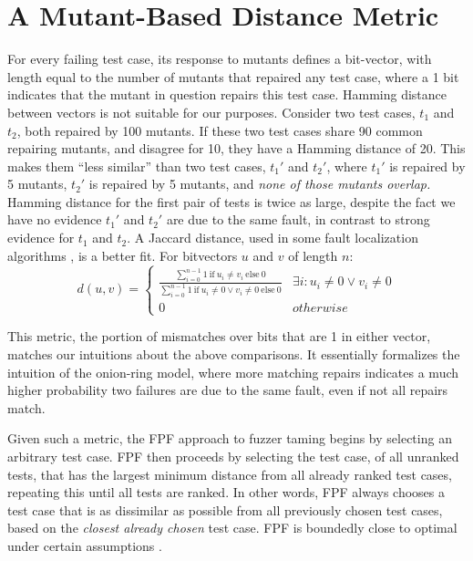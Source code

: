 \section{A Mutant-Based Distance Metric}

For every failing test case, its response to mutants defines a bit-vector, with
length equal to the number of mutants that repaired any test case,
where a 1 bit indicates that the mutant in question repairs this test
case.  Hamming distance between vectors is not suitable for our purposes.  Consider two test cases, $t_1$ and $t_2$, both repaired
by 100 mutants.  If these two test cases share 90 common repairing
mutants, and disagree for 10, they have a Hamming
distance of 20.  This makes them ``less similar'' than two test cases,
$t_1'$ and $t_2'$, where $t_1'$ is repaired by 5 mutants, $t_2'$ is
repaired by 5 mutants, and \emph{none of those mutants overlap.}   Hamming distance for the first pair of tests is twice as
large, despite the fact we have no evidence $t_1'$ and
$t_2'$ are due to the same fault, in contrast to strong evidence for $t_1$ and $t_2$.  A Jaccard distance, used in some fault
localization algorithms \cite{Liu06}, is a better fit.  For bitvectors $u$ and $v$ of length $n$:
\[d(u,v) = 
\begin{cases}
\frac{\sum_{i=0}^{n-1} 1\ \text{if}\ u_i \neq v_i\ \text{else}\ 0}{\sum_{i=0}^{n-1} 1
\  \text{if}\ u_i \neq 0 \vee v_i \neq 0\ \text{else}\ 0} & \exists i:u_i\neq 0 \vee v_i\neq 0\\
0 & otherwise
\end{cases}
\]

This metric, the portion of mismatches over bits that are 1 in either
vector, matches our intuitions about the above comparisons.  It
essentially formalizes the intuition of the onion-ring model, where
more matching repairs indicates a much higher probability two failures
are due to the same fault, even if not all repairs match.

Given such a metric, the FPF \cite{Gonzalez} approach to fuzzer taming \cite{PLDI13}
begins by selecting an arbitrary test case.   FPF then proceeds by selecting the test
case, of all unranked tests, that has the largest minimum distance
from all already ranked test cases, repeating this until all tests are
ranked.  In other words, FPF always chooses a test case that is as dissimilar as
possible from all previously chosen test cases, based on the \emph{closest
already chosen} test case.  FPF is boundedly close
to optimal under certain assumptions \cite{Gonzalez}.

